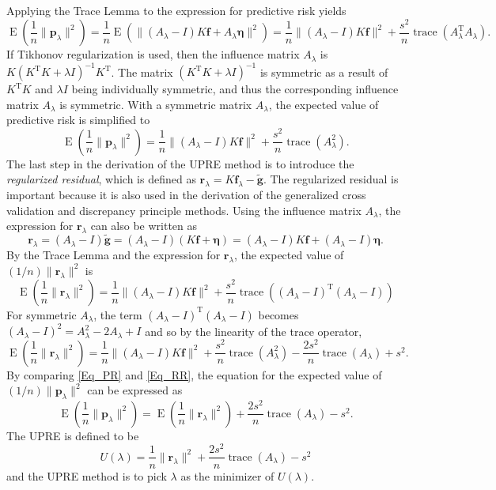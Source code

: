 \documentclass[12pt]{article}
\newcommand{\gnoise}{\widetilde{\mathbf{g}}}
\newcommand{\kmat}{K}	%
\newcommand{\fdis}{\mathbf{f}}
\newcommand{\trans}{\mathrm{T}}	%
\newcommand{\trace}{\operatorname{trace}}	%
\newcommand{\regparam}{\lambda}
\newcommand{\freg}{\fdis_{\regparam}}	%
\newcommand{\SD}{s}	%
\newcommand{\noise}{\bm{\eta}}	%
\newcommand{\E}{\operatorname{E}}	%
\newcommand{\PE}{\mathbf{p}_{\regparam}}	%
\newcommand{\regres}{\mathbf{r}_{\regparam}}	%
\newcommand{\A}{A_{\regparam}}	%
\newcommand{\U}{U}	%
\begin{document}
\noindent Applying the Trace Lemma to the expression for predictive risk yields
\[\E\left(\frac{1}{n}\|\PE\|^2\right) = \frac{1}{n}\E\left(\|(\A-I)\kmat\fdis + \A\noise\|^2\right) = \frac{1}{n}\|(\A-I)\kmat\fdis\|^2 + \frac{\SD^2}{n}\trace({\A^\trans}\A).\]
If Tikhonov regularization is used, then the influence matrix $\A$ is $\kmat(\kmat^\trans\kmat + \regparam{I})^{-1}\kmat^\trans$. The matrix $(\kmat^\trans\kmat + \regparam{I})^{-1}$ is symmetric as a result of $\kmat^\trans\kmat$ and $\regparam{I}$ being individually symmetric, and thus the corresponding influence matrix $\A$ is symmetric.  With a symmetric matrix $\A$, the expected value of predictive risk is simplified to
\begin{equation}
\label{Eq_PR}
\E\left(\frac{1}{n}\|\PE\|^2\right) = \frac{1}{n}\|(\A-I)\kmat\fdis\|^2 + \frac{\SD^2}{n}\trace(\A^2).
\end{equation}
\indent The last step in the derivation of the UPRE method is to introduce the \textit{regularized residual}, which is defined as $\regres = \kmat\freg - \gnoise$. The regularized residual is important because it is also used in the derivation of the generalized cross validation and discrepancy principle methods. Using the influence matrix $\A$, the expression for $\regres$ can also be written as
\[\regres = (\A-I)\gnoise = (\A-I)(\kmat\fdis + \noise) = (\A-I)\kmat\fdis + (\A-I)\noise.\]
By the Trace Lemma and the expression for $\regres$, the expected value of $(1/n)\|\regres\|^2$ is
\[\E\left(\frac{1}{n}\|\regres\|^2\right) = \frac{1}{n}\|(\A-I)\kmat\fdis\|^2 + \frac{\SD^2}{n}\trace({(\A-I)^\trans}(\A-I))\]
For symmetric $\A$, the term $(\A-I)^\trans(\A-I)$ becomes $(\A-I)^2 = \A^2 - 2\A + I$ and so by the linearity of the trace operator,
\begin{equation}
\label{Eq_RR}
\E\left(\frac{1}{n}\|\regres\|^2\right) = \frac{1}{n}\|(\A-I)\kmat\fdis\|^2 + \frac{\SD^2}{n}\trace(\A^2) - \frac{2\SD^2}{n}\trace(\A) + \SD^2.
\end{equation}
By comparing \eqref{Eq_PR} and \eqref{Eq_RR}, the equation for the expected value of $(1/n)\|\PE\|^2$ can be expressed as
\[\E\left(\frac{1}{n}\|\PE\|^2\right) = \E\left(\frac{1}{n}\|\regres\|^2\right) + \frac{2\SD^2}{n}\trace(\A) - \SD^2.\]
The UPRE is defined to be
\begin{equation}
\label{Eq_UPRE}
\U(\regparam) = \frac{1}{n}\|\regres\|^2 + \frac{2\SD^2}{n}\trace(\A) - \SD^2
\end{equation}
and the UPRE method is to pick $\regparam$ as the minimizer of $\U(\regparam)$.
\end{document}
